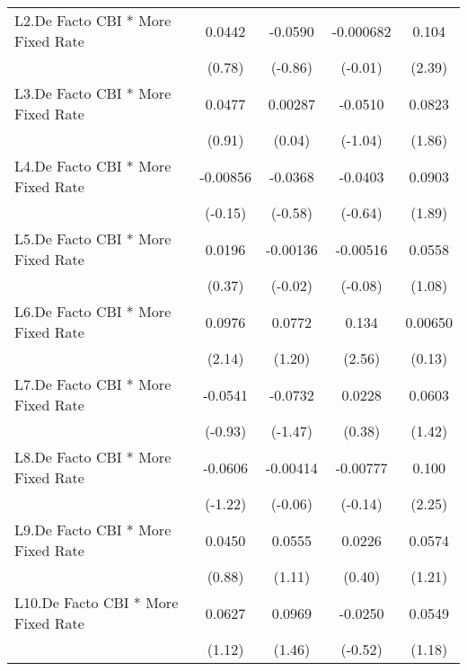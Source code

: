 {\begin{longtable}{l*{4}{c}}
\addlinespace
L2.De Facto CBI * More Fixed Rate&   0.0442         &  -0.0590         &-0.000682         &    0.104\sym{*}  \\
                &   (0.78)         &  (-0.86)         &  (-0.01)         &   (2.39)         \\
\addlinespace
L3.De Facto CBI * More Fixed Rate&   0.0477         &  0.00287         &  -0.0510         &   0.0823         \\
                &   (0.91)         &   (0.04)         &  (-1.04)         &   (1.86)         \\
\addlinespace
L4.De Facto CBI * More Fixed Rate& -0.00856         &  -0.0368         &  -0.0403         &   0.0903         \\
                &  (-0.15)         &  (-0.58)         &  (-0.64)         &   (1.89)         \\
\addlinespace
L5.De Facto CBI * More Fixed Rate&   0.0196         & -0.00136         & -0.00516         &   0.0558         \\
                &   (0.37)         &  (-0.02)         &  (-0.08)         &   (1.08)         \\
\addlinespace
L6.De Facto CBI * More Fixed Rate&   0.0976\sym{*}  &   0.0772         &    0.134\sym{*}  &  0.00650         \\
                &   (2.14)         &   (1.20)         &   (2.56)         &   (0.13)         \\
\addlinespace
L7.De Facto CBI * More Fixed Rate&  -0.0541         &  -0.0732         &   0.0228         &   0.0603         \\
                &  (-0.93)         &  (-1.47)         &   (0.38)         &   (1.42)         \\
\addlinespace
L8.De Facto CBI * More Fixed Rate&  -0.0606         & -0.00414         & -0.00777         &    0.100\sym{*}  \\
                &  (-1.22)         &  (-0.06)         &  (-0.14)         &   (2.25)         \\
\addlinespace
L9.De Facto CBI * More Fixed Rate&   0.0450         &   0.0555         &   0.0226         &   0.0574         \\
                &   (0.88)         &   (1.11)         &   (0.40)         &   (1.21)         \\
\addlinespace
L10.De Facto CBI * More Fixed Rate&   0.0627         &   0.0969         &  -0.0250         &   0.0549         \\
                &   (1.12)         &   (1.46)         &  (-0.52)         &   (1.18)         \\

\end{longtable}}
